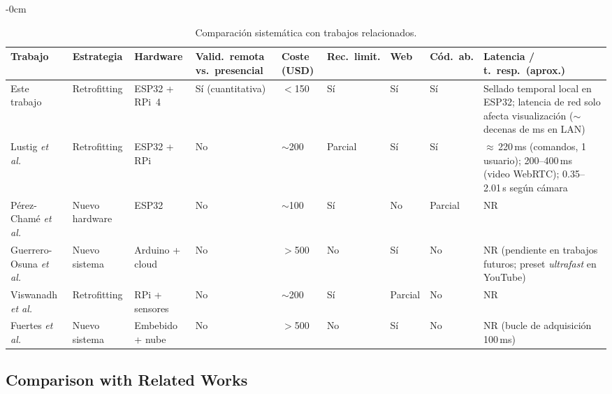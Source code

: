 \documentclass[journal,article,submit,pdftex]{Definitions/mdpi}
\begin{document}
\begin{table}[H]
\caption{Comparaci\'on sistem\'atica con trabajos relacionados.}
\label{tab:comparacion}
\small
\begin{adjustwidth}{-\extralength}{0cm}
	\renewcommand{\arraystretch}{1.4}
	\begin{tabular}{p{2.5cm}p{1.6cm}p{1.8cm}p{2.2cm}p{1.0cm}p{1.0cm}p{0.8cm}p{0.8cm}p{3.5cm}}
		\toprule
		\textbf{Trabajo} & \textbf{Estrategia} & \textbf{Hardware} & \textbf{Valid.\ remota vs.\ presencial} & \textbf{Coste (USD)} & \textbf{Rec.\ limit.} & \textbf{Web} & \textbf{C\'od.\ ab.} & \textbf{Latencia / t.\ resp.\ (aprox.)} \\
		\midrule
		Este trabajo                               & Retrofitting   & ESP32 + RPi~4   & S\'i (cuantitativa) & $<$150      & S\'i    & S\'i    & S\'i    & Sellado temporal local en ESP32; latencia de red solo afecta visualizaci\'on ($\sim$decenas de ms en LAN) \\
		Lustig \textit{et al.}~\cite{r10}          & Retrofitting   & ESP32 + RPi     & No                  & $\sim$200   & Parcial & S\'i    & S\'i    & $\approx$\,220\,ms (comandos, 1 usuario); 200--400\,ms (video WebRTC); 0.35--2.01\,s seg\'un c\'amara \\
		P\'erez-Cham\'e \textit{et al.}~\cite{r11} & Nuevo hardware & ESP32           & No                  & $\sim$100   & S\'i    & No      & Parcial & NR \\
		Guerrero-Osuna \textit{et al.}~\cite{r4}   & Nuevo sistema  & Arduino + cloud & No                  & $>$500      & No      & S\'i    & No      & NR (pendiente en trabajos futuros; preset \textit{ultrafast} en YouTube) \\
		Viswanadh \textit{et al.}~\cite{r2}        & Retrofitting   & RPi + sensores  & No                  & $\sim$200   & S\'i    & Parcial & No      & NR \\
		Fuertes \textit{et al.}~\cite{r3}          & Nuevo sistema  & Embebido + nube & No                  & $>$500      & No      & S\'i    & No      & NR (bucle de adquisici\'on 100\,ms) \\
		\bottomrule
	\end{tabular}
\end{adjustwidth}
\end{table}


\subsection{Comparison with Related Works}
\end{document}
